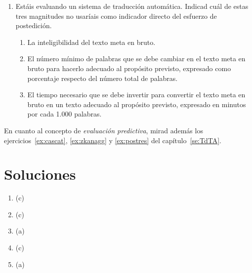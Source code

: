 \begin{enumerate}
\item Estáis evaluando un sistema de traducción automática. Indicad cuál de estas tres magnitudes no usaríais como indicador directo del esfuerzo de postedición. \begin{enumerate} \item La inteligibilidad del texto meta en bruto. \item El número mínimo de palabras que se debe cambiar en el texto meta en bruto para hacerlo adecuado al propósito previsto, expresado como porcentaje respecto del número total de palabras. \item El tiempo necesario que se debe invertir para convertir el texto meta en bruto en un texto adecuado al propósito previsto, expresado en minutos por cada 1.000 palabras. \end{enumerate} 

\end{enumerate} 

En cuanto al concepto de \emph{evaluación predictiva}, mirad además los ejercicios~\ref{ex:cascat}, \ref{ex:zkanagg} y \ref{ex:postres} del  capítulo~\ref{se:TdTA}. 

\section{Soluciones} 

\begin{enumerate} \item (c) \item (c) \item (a) \item (c) \item (a) \end{enumerate} 

